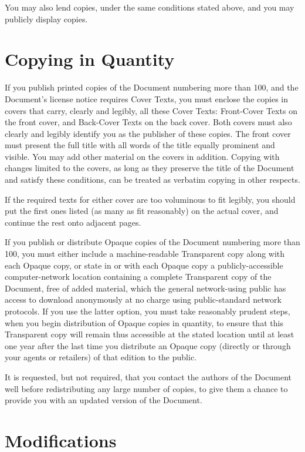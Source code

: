\documentclass[oneside,a4paper]{book}
\begin{document}
You may also lend copies, under the same conditions stated above, and
you may publicly display copies.


\section{Copying in Quantity}

If you publish printed copies of the Document numbering more than 100,
and the Document's license notice requires Cover Texts, you must enclose
the copies in covers that carry, clearly and legibly, all these Cover
Texts: Front-Cover Texts on the front cover, and Back-Cover Texts on
the back cover.  Both covers must also clearly and legibly identify
you as the publisher of these copies.  The front cover must present
the full title with all words of the title equally prominent and
visible.  You may add other material on the covers in addition.
Copying with changes limited to the covers, as long as they preserve
the title of the Document and satisfy these conditions, can be treated
as verbatim copying in other respects.

If the required texts for either cover are too voluminous to fit
legibly, you should put the first ones listed (as many as fit
reasonably) on the actual cover, and continue the rest onto adjacent
pages.

If you publish or distribute Opaque copies of the Document numbering
more than 100, you must either include a machine-readable Transparent
copy along with each Opaque copy, or state in or with each Opaque copy
a publicly-accessible computer-network location containing a complete
Transparent copy of the Document, free of added material, which the
general network-using public has access to download anonymously at no
charge using public-standard network protocols.  If you use the latter
option, you must take reasonably prudent steps, when you begin
distribution of Opaque copies in quantity, to ensure that this
Transparent copy will remain thus accessible at the stated location
until at least one year after the last time you distribute an Opaque
copy (directly or through your agents or retailers) of that edition to
the public.

It is requested, but not required, that you contact the authors of the
Document well before redistributing any large number of copies, to give
them a chance to provide you with an updated version of the Document.


\section{Modifications}
\end{document}
